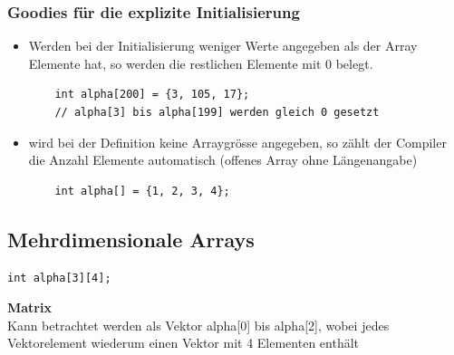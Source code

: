 \subsubsection{Goodies für die explizite Initialisierung}
\label{sec:Goodies fuer die explizite Initialisierung}
\begin{itemize}
	\item Werden bei der Initialisierung weniger Werte angegeben als der Array Elemente hat, so werden die restlichen Elemente mit 0 belegt.\\
	\noindent
	\begin{minipage}{\linewidth}
	\begin{lstlisting}
	int alpha[200] = {3, 105, 17};
	// alpha[3] bis alpha[199] werden gleich 0 gesetzt
	\end{lstlisting}
	\end{minipage}
	\item wird bei der Definition keine Arraygrösse angegeben, so zählt der Compiler die Anzahl Elemente automatisch (offenes Array ohne Längenangabe)
	\noindent
	\begin{minipage}{\linewidth}
	\begin{lstlisting}
	int alpha[] = {1, 2, 3, 4};
	\end{lstlisting}
	\end{minipage}
\end{itemize}


\subsection{Mehrdimensionale Arrays}
\label{sec:Mehrdimensionale Arrays}
\noindent
\begin{minipage}{\linewidth}
\begin{lstlisting}
int alpha[3][4];
\end{lstlisting}
\end{minipage}

\textbf{Matrix}\\
Kann betrachtet werden als Vektor alpha[0] bis alpha[2], wobei jedes Vektorelement wiederum einen Vektor mit 4 Elementen enthält\\
\vspace{5mm}
\begin{figure}[h]
	\centering
	
\end{figure}


